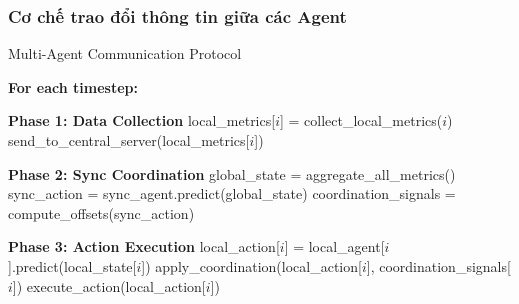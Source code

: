 \subsubsection{Cơ chế trao đổi thông tin giữa các Agent}


\begin{algorithm}[!htp]
    \caption{Multi-Agent Communication Protocol}
    \begin{algorithmic}[1] 
        \State \textbf{For each timestep:}
        
        \State \textbf{Phase 1: Data Collection}
            \State local\_metrics[$i$] = collect\_local\_metrics($i$)
            \State send\_to\_central\_server(local\_metrics[$i$]) 
        \EndFor
        
        \State \textbf{Phase 2: Sync Coordination}
        \State global\_state = aggregate\_all\_metrics()
        \State sync\_action = sync\_agent.predict(global\_state) 
        \State coordination\_signals = compute\_offsets(sync\_action)
        
        \State \textbf{Phase 3: Action Execution} 
            \State local\_action[$i$] = local\_agent[$i$].predict(local\_state[$i$]) 
            \State apply\_coordination(local\_action[$i$], coordination\_signals[$i$]) 
            \State execute\_action(local\_action[$i$]) 
        \EndFor
    \end{algorithmic}
\end{algorithm}

